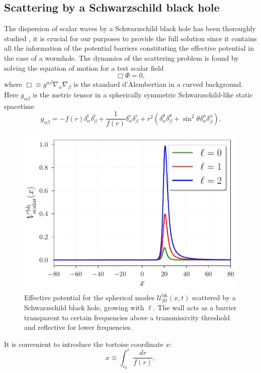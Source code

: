 \documentclass[article,aps,nofootinbib,twocolumn,superscriptaddress]{revtex4-1}
\begin{document}
\subsection{Scattering by a Schwarzschild black hole}\label{subsec:bh} 
The dispersion of scalar waves by a Schwarzschild black hole has been thoroughly studied \citep{doi:10.1063/1.522949, Sanchez:1976xm, Sanchez:1977si, Sanchez:1977vz}, it is crucial for our purposes to provide the full solution since it contains all the information of the potential barriers constituting the effective potential in the case of a wormhole. The dynamics of the scattering problem is found by solving the equation of motion for a test scalar field
\begin{equation}
\Box\Phi=0,\label{eq:scalar_eq_mov} 
\end{equation}
where $\Box\equiv g^{\alpha\beta}\nabla_{\alpha}\nabla_{\beta}$ is the standard d'Alembertian in a curved background. Here $g_{\alpha\beta}$ is the metric tensor in a spherically symmetric Schwarzschild-like static spacetime
\begin{equation}
g_{\alpha\beta}=-f(r)\delta^t_{\alpha}\delta^t_{\beta}+\frac{1}{f(r)}\delta^r_{\alpha}\delta^r_{\beta}+r^2\left(\delta^{\theta}_{\alpha}\delta^{\theta}_{\beta}+\sin^2\theta\delta^{\phi}_{\alpha}\delta^{\phi}_{\beta}\right).
\label{eq:Schwarzschild}
\end{equation}
\begin{figure}[t]
\centering
\includegraphics[width=.45\textwidth]{figures/potential_scalar_bh.pdf}
\caption{\label{fig:Potential_BH} Effective potential for the spherical modes $\mathcal{U}^{\mathrm{bh}}_{20}(x,t)$ scattered by a Schwarzschild black hole, growing with $\ell$. The wall acts as a barrier transparent to certain frequencies above a transmissivity threshold and reflective for lower frequencies.}
\end{figure}
It is convenient to introduce the tortoise coordinate $x$:
\begin{equation}
x\equiv\displaystyle{\int_{r_0}^r\frac{dr}{f(r)}},
\label{eq:tortoise}
\end{equation} 
\end{document}
